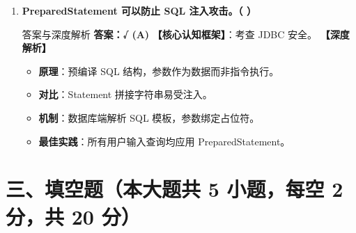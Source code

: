 ﻿\documentclass[12pt, a4paper]{ctexart}
\begin{document}
\begin{enumerate}[label=\arabic*.]
	\item \textbf{PreparedStatement 可以防止 SQL 注入攻击。（ \quad ）}
	      \begin{bluebox}{答案与深度解析}
		      \textbf{答案：√ (A)}
		      \textbf{【核心认知框架】}：考查 JDBC 安全。
		      \textbf{【深度解析】}
		      \begin{itemize}[leftmargin=*, nosep]
			      \item \textbf{原理}：预编译 SQL 结构，参数作为数据而非指令执行。
			      \item \textbf{对比}：Statement 拼接字符串易受注入。
			      \item \textbf{机制}：数据库端解析 SQL 模板，参数绑定占位符。
			      \item \textbf{最佳实践}：所有用户输入查询均应用 PreparedStatement。
		      \end{itemize}
	      \end{bluebox}
\end{enumerate}

\section*{三、填空题（本大题共 5 小题，每空 2 分，共 20 分）}
\end{document}
